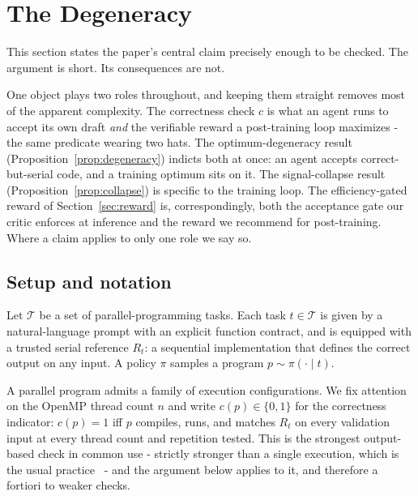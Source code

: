 \section{The Degeneracy}
\label{sec:degeneracy}

This section states the paper's central claim precisely enough to be checked.
The argument is short. Its consequences are not.

One object plays two roles throughout, and keeping them straight removes most of
the apparent complexity. The correctness check $c$ is what an agent runs to
accept its own draft \emph{and} the verifiable reward a post-training loop
maximizes - the same predicate wearing two hats. The optimum-degeneracy result
(Proposition~\ref{prop:degeneracy}) indicts both at once: an agent accepts
correct-but-serial code, and a training optimum sits on it. The signal-collapse
result (Proposition~\ref{prop:collapse}) is specific to the training loop. The
efficiency-gated reward of Section~\ref{sec:reward} is, correspondingly, both the
acceptance gate our critic enforces at inference and the reward we recommend for
post-training. Where a claim applies to only one role we say so.

\subsection{Setup and notation}

Let $\mathcal{T}$ be a set of parallel-programming tasks. Each task
$t \in \mathcal{T}$ is given by a natural-language prompt with an explicit
function contract, and is equipped with a trusted serial reference $R_t$: a
sequential implementation that defines the correct output on any input. A
policy $\pi$ samples a program $p \sim \pi(\cdot \mid t)$.

A parallel program admits a family of execution configurations. We fix
attention on the OpenMP thread count $n$ and write $c(p) \in \{0,1\}$ for the
correctness indicator: $c(p)=1$ iff $p$ compiles, runs, and matches $R_t$ on
every validation input at every thread count and repetition tested. This is
the strongest output-based check in common use - strictly stronger than a
single execution, which is the usual practice~\cite{pareval} - and the argument
below applies to it, and therefore a fortiori to weaker checks.

